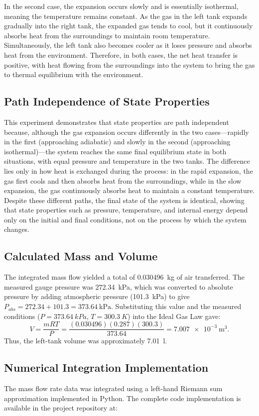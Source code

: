 \documentclass[12pt]{article}
\begin{document}
In the second case, the expansion occurs slowly and is essentially isothermal, meaning the temperature remains constant. As the gas in the left tank expands gradually into the right tank, the expanded gas tends to cool, but it continuously absorbs heat from the surroundings to maintain room temperature. Simultaneously, the left tank also becomes cooler as it loses pressure and absorbs heat from the environment. Therefore, in both cases, the net heat transfer is positive, with heat flowing from the surroundings into the system to bring the gas to thermal equilibrium with the environment.

\subsection*{Path Independence of State Properties}
This experiment demonstrates that state properties are path independent because, although the gas expansion occurs differently in the two cases—rapidly in the first (approaching adiabatic) and slowly in the second (approaching isothermal)—the system reaches the same final equilibrium state in both situations, with equal pressure and temperature in the two tanks. The difference lies only in how heat is exchanged during the process: in the rapid expansion, the gas first cools and then absorbs heat from the surroundings, while in the slow expansion, the gas continuously absorbs heat to maintain a constant temperature. Despite these different paths, the final state of the system is identical, showing that state properties such as pressure, temperature, and internal energy depend only on the initial and final conditions, not on the process by which the system changes.

\subsection*{Calculated Mass and Volume}
The integrated mass flow yielded a total of \SI{0.030496}{\kilogram} of air transferred. The measured gauge pressure was \SI{272.34}{\kPa}, which was converted to absolute pressure by adding atmospheric pressure (\SI{101.3}{\kPa}) to give \(P_{abs} = 272.34 + 101.3 = \SI{373.64}{\kPa}\). Substituting this value and the measured conditions (\(P = 373.64~\si{kPa}\), \(T = 300.3~\si{K}\)) into the Ideal Gas Law gave:
\[
V = \frac{mRT}{P} =
\frac{(0.030496)(0.287)(300.3)}{373.64} =
\SI{7.007e-3}{\metre\cubed}.
\]
Thus, the left-tank volume was approximately \SI{7.01}{\litre}.

\subsection*{Numerical Integration Implementation}
The mass flow rate data was integrated using a left-hand Riemann sum approximation implemented in Python. The complete code implementation is available in the project repository at:
\end{document}
